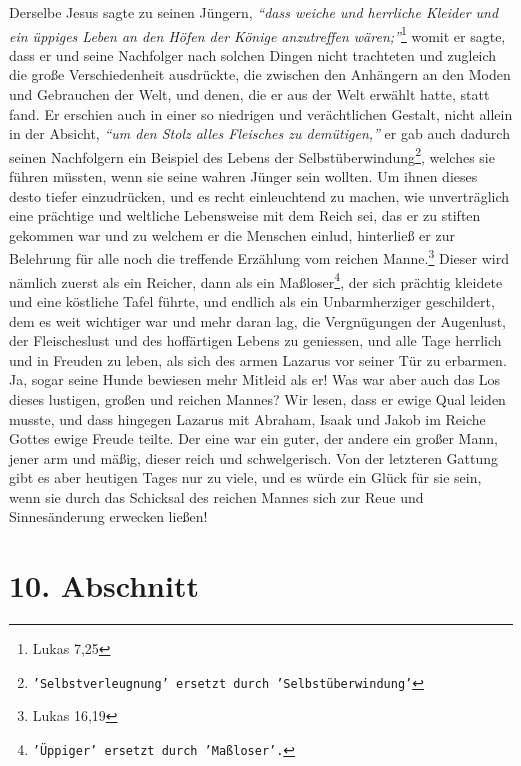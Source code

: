 Derselbe Jesus sagte
zu seinen Jüngern,
\textit{"`dass weiche und herrliche Kleider und ein üppiges Leben an
den Höfen der Könige anzutreffen wären;"'}\footnote{Lukas 7,25}
womit er sagte,
dass er und seine Nachfolger nach solchen Dingen nicht trachteten und zugleich
die große Verschiedenheit ausdrückte, die zwischen den Anhängern an den Moden
und Gebrauchen der Welt, und denen, die er aus der Welt erwählt hatte, statt
fand. Er erschien auch in einer so niedrigen und verächtlichen Gestalt, nicht
allein in der Absicht,
\textit{"`um den Stolz alles Fleisches zu demütigen,"'} er gab
auch dadurch seinen Nachfolgern ein Beispiel des Lebens der
Selbstüberwindung\footnote{\texttt{'Selbstverleugnung' ersetzt durch
'Selbstüberwindung'}},
welches sie führen müssten, wenn sie seine wahren Jünger sein wollten. Um ihnen
dieses desto tiefer einzudrücken, und es recht einleuchtend zu machen, wie
unverträglich eine prächtige und weltliche Lebensweise mit dem Reich sei, das
er zu stiften gekommen war und zu welchem er die Menschen einlud, hinterließ
er zur Belehrung für alle noch die treffende Erzählung vom reichen
Manne.\footnote{Lukas 16,19}
Dieser wird nämlich zuerst als ein Reicher, dann als
ein Maßloser\footnote{\texttt{'Üppiger' ersetzt durch 'Maßloser'.}}, der sich
prächtig
kleidete und eine köstliche Tafel führte, und
endlich als ein Unbarmherziger geschildert, dem es weit wichtiger war und mehr
daran lag, die Vergnügungen der Augenlust, der Fleischeslust und des hoffärtigen
Lebens zu geniessen, und alle Tage herrlich und in Freuden zu leben, als sich
des
armen Lazarus vor seiner Tür zu erbarmen. Ja, sogar
seine Hunde
bewiesen mehr
Mitleid als er! Was war aber auch das Los dieses lustigen, großen
und reichen
Mannes? Wir lesen, dass er ewige Qual leiden musste, und dass
hingegen Lazarus mit
Abraham, Isaak und
Jakob
im Reiche Gottes ewige Freude teilte. Der eine war ein
guter, der andere ein großer Mann, jener arm und mäßig, dieser reich und
schwelgerisch. Von der letzteren Gattung gibt es aber heutigen Tages nur zu
viele, und es würde ein Glück für sie sein, wenn sie durch das Schicksal des
reichen Mannes sich zur Reue und Sinnesänderung erwecken ließen!

\section{10. Abschnitt} \label{kap14_ab10}

